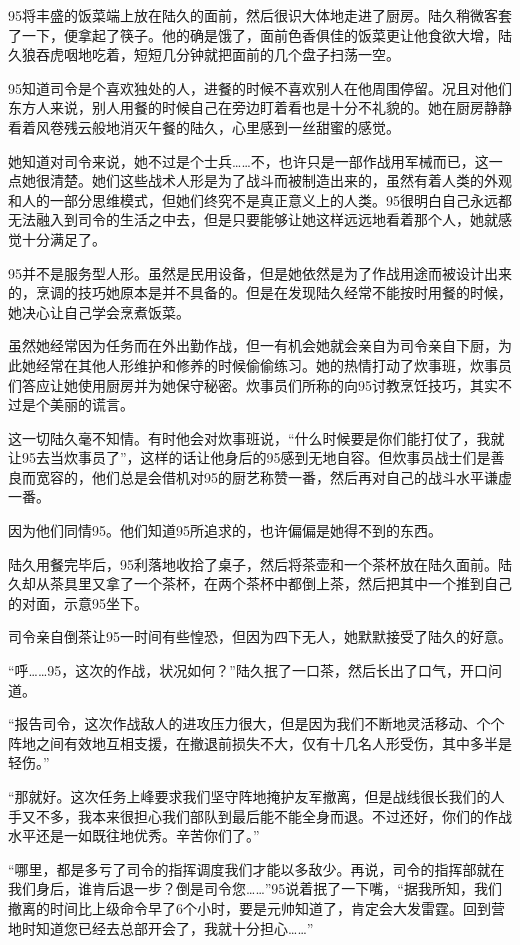 95将丰盛的饭菜端上放在陆久的面前，然后很识大体地走进了厨房。陆久稍微客套了一下，便拿起了筷子。他的确是饿了，面前色香俱佳的饭菜更让他食欲大增，陆久狼吞虎咽地吃着，短短几分钟就把面前的几个盘子扫荡一空。

95知道司令是个喜欢独处的人，进餐的时候不喜欢别人在他周围停留。况且对他们东方人来说，别人用餐的时候自己在旁边盯着看也是十分不礼貌的。她在厨房静静看着风卷残云般地消灭午餐的陆久，心里感到一丝甜蜜的感觉。

她知道对司令来说，她不过是个士兵……不，也许只是一部作战用军械而已，这一点她很清楚。她们这些战术人形是为了战斗而被制造出来的，虽然有着人类的外观和人的一部分思维模式，但她们终究不是真正意义上的人类。95很明白自己永远都无法融入到司令的生活之中去，但是只要能够让她这样远远地看着那个人，她就感觉十分满足了。

95并不是服务型人形。虽然是民用设备，但是她依然是为了作战用途而被设计出来的，烹调的技巧她原本是并不具备的。但是在发现陆久经常不能按时用餐的时候，她决心让自己学会烹煮饭菜。

虽然她经常因为任务而在外出勤作战，但一有机会她就会亲自为司令亲自下厨，为此她经常在其他人形维护和修养的时候偷偷练习。她的热情打动了炊事班，炊事员们答应让她使用厨房并为她保守秘密。炊事员们所称的向95讨教烹饪技巧，其实不过是个美丽的谎言。

这一切陆久毫不知情。有时他会对炊事班说，“什么时候要是你们能打仗了，我就让95去当炊事员了”，这样的话让他身后的95感到无地自容。但炊事员战士们是善良而宽容的，他们总是会借机对95的厨艺称赞一番，然后再对自己的战斗水平谦虚一番。

因为他们同情95。他们知道95所追求的，也许偏偏是她得不到的东西。

陆久用餐完毕后，95利落地收拾了桌子，然后将茶壶和一个茶杯放在陆久面前。陆久却从茶具里又拿了一个茶杯，在两个茶杯中都倒上茶，然后把其中一个推到自己的对面，示意95坐下。

司令亲自倒茶让95一时间有些惶恐，但因为四下无人，她默默接受了陆久的好意。

“呼……95，这次的作战，状况如何？”陆久抿了一口茶，然后长出了口气，开口问道。

“报告司令，这次作战敌人的进攻压力很大，但是因为我们不断地灵活移动、个个阵地之间有效地互相支援，在撤退前损失不大，仅有十几名人形受伤，其中多半是轻伤。”

“那就好。这次任务上峰要求我们坚守阵地掩护友军撤离，但是战线很长我们的人手又不多，我本来很担心我们部队到最后能不能全身而退。不过还好，你们的作战水平还是一如既往地优秀。辛苦你们了。”

“哪里，都是多亏了司令的指挥调度我们才能以多敌少。再说，司令的指挥部就在我们身后，谁肯后退一步？倒是司令您……”95说着抿了一下嘴，“据我所知，我们撤离的时间比上级命令早了6个小时，要是元帅知道了，肯定会大发雷霆。回到营地时知道您已经去总部开会了，我就十分担心……”

